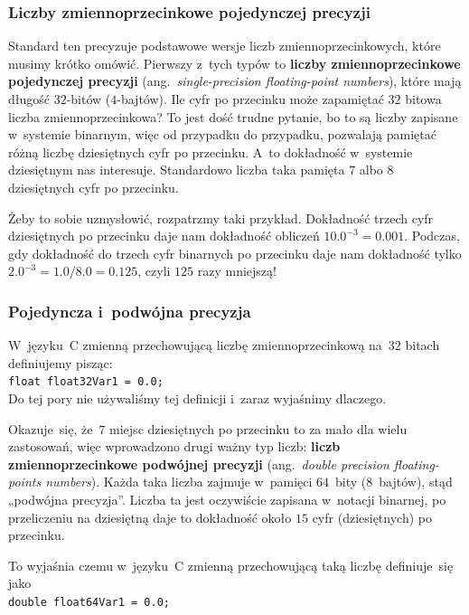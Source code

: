 \documentclass[10pt,t]{beamer}
\begin{document}
\begin{frame}
  \frametitle{Liczby zmiennoprzecinkowe pojedynczej precyzji}


  Standard ten precyzuje podstawowe wersje liczb zmiennoprzecinkowych, które
  musimy krótko omówić. Pierwszy z~tych typów to \textbf{liczby
    zmiennoprzecinkowe pojedynczej precyzji} (ang.~\textit{single-precision
    floating-point numbers}), które mają długość $32$-bitów ($4$-bajtów).
  Ile cyfr po przecinku może zapamiętać $32$ bitowa liczba
  zmiennoprzecinkowa? To jest dość trudne pytanie, bo to są liczby zapisane
  w~systemie \alert{binarnym}, więc od przypadku do przypadku, pozwalają
  pamiętać różną liczbę \alert{dziesiętnych} cyfr po przecinku. A~to
  dokładność w~systemie dziesiętnym nas interesuje. Standardowo liczba
  taka pamięta $7$ albo $8$ \alert{dziesiętnych} cyfr po przecinku.

  Żeby to sobie uzmysłowić, rozpatrzmy taki przykład. Dokładność trzech
  cyfr \alert{dziesiętnych} po przecinku daje nam dokładność
  obliczeń $10.0^{ -3 } = 0.001$. Podczas, gdy dokładność do trzech cyfr
  \alert{binarnych} po przecinku daje nam dokładność tylko
  $2.0^{ -3 } = 1.0 / 8.0 = 0.125$, czyli $125$ razy mniejszą!

\end{frame}





\begin{frame}
  \frametitle{Pojedyncza i~podwójna precyzja}


  W~języku~C zmienną przechowującą liczbę zmiennoprzecinkową na~$32$ bitach
  definiujemy pisząc: \\
  \texttt{float float32Var1 = 0.0;} \\
  Do tej pory nie używaliśmy tej definicji i~zaraz wyjaśnimy dlaczego.

  Okazuje~się, że~$7$ miejsc dziesiętnych po przecinku to za mało dla
  wielu zastosowań, więc wprowadzono drugi ważny typ liczb:
  \textbf{liczb zmiennoprzecinkowe podwójnej precyzji}
  (ang.~\textit{double precision floating-points numbers}). Każda
  taka liczba zajmuje w~pamięci $64$~bity ($8$~bajtów), stąd „podwójna
  precyzja”. Liczba ta jest oczywiście zapisana w~notacji binarnej, po
  przeliczeniu na dziesiętną daje to dokładność około $15$ cyfr
  (dziesiętnych) po przecinku.

  To wyjaśnia czemu w~języku~C zmienną przechowującą taką liczbę
  definiuje~się jako \\
  \texttt{double float64Var1 = 0.0;} \\

\end{frame}
\end{document}
